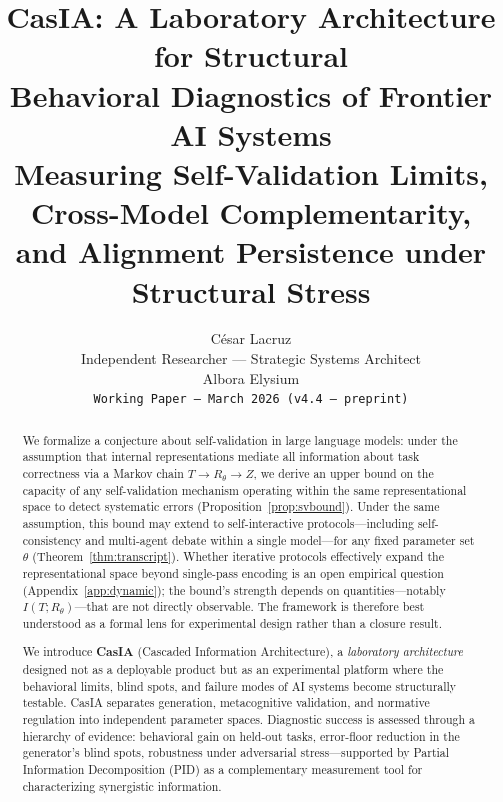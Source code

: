 \documentclass[11pt,a4paper]{article}
\title{%
\textbf{CasIA: A Laboratory Architecture for Structural\\
Behavioral Diagnostics of Frontier AI Systems}\\[6pt]
\large Measuring Self-Validation Limits, Cross-Model Complementarity,\\
and Alignment Persistence under Structural Stress
}
\author{
C\'esar Lacruz\\
Independent Researcher --- Strategic Systems Architect\\
Albora Elysium\\
\texttt{Working Paper --- March 2026 (v4.4 --- preprint)}
}
\date{}
\theoremstyle{definition}
\begin{document}
\maketitle

\begin{abstract}
We formalize a conjecture about self-validation in large language models: under the assumption that internal representations mediate all information about task correctness via a Markov chain $T \to R_\theta \to Z$, we derive an upper bound on the capacity of any self-validation mechanism operating within the same representational space to detect systematic errors (Proposition~\ref{prop:svbound}). Under the same assumption, this bound may extend to self-interactive protocols---including self-consistency and multi-agent debate within a single model---for any fixed parameter set $\theta$ (Theorem~\ref{thm:transcript}). Whether iterative protocols effectively expand the representational space beyond single-pass encoding is an open empirical question (Appendix~\ref{app:dynamic}); the bound's strength depends on quantities---notably $I(T; R_\theta)$---that are not directly observable. The framework is therefore best understood as a formal lens for experimental design rather than a closure result.

We introduce \textbf{CasIA} (Cascaded Information Architecture), a \emph{laboratory architecture} designed not as a deployable product but as an experimental platform where the behavioral limits, blind spots, and failure modes of AI systems become structurally testable. CasIA separates generation, metacognitive validation, and normative regulation into independent parameter spaces. Diagnostic success is assessed through a hierarchy of evidence: behavioral gain on held-out tasks, error-floor reduction in the generator's blind spots, robustness under adversarial stress---supported by Partial Information Decomposition (PID) as a complementary measurement tool for characterizing synergistic information.


\end{abstract}
\end{document}
